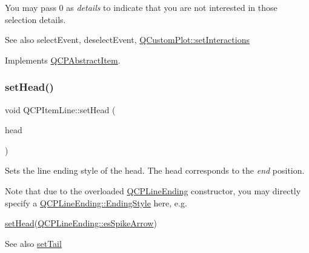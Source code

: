 You may pass 0 as {\itshape details} to indicate that you are not interested in those selection details.

\begin{DoxySeeAlso}{See also}
select\+Event, deselect\+Event, \hyperlink{class_q_custom_plot_a5ee1e2f6ae27419deca53e75907c27e5}{Q\+Custom\+Plot\+::set\+Interactions} 
\end{DoxySeeAlso}


Implements \hyperlink{class_q_c_p_abstract_item_a96d522d10ffc0413b9a366c6f7f0476b}{Q\+C\+P\+Abstract\+Item}.

\hypertarget{class_q_c_p_item_line_aebf3d687114d584e0459db6759e2c3c3}{}\label{class_q_c_p_item_line_aebf3d687114d584e0459db6759e2c3c3} 
\subsubsection{\texorpdfstring{set\+Head()}{setHead()}}
{\footnotesize\ttfamily void Q\+C\+P\+Item\+Line\+::set\+Head (\begin{DoxyParamCaption}\item[{const \hyperlink{class_q_c_p_line_ending}{Q\+C\+P\+Line\+Ending} \&}]{head }\end{DoxyParamCaption})}

Sets the line ending style of the head. The head corresponds to the {\itshape end} position.

Note that due to the overloaded \hyperlink{class_q_c_p_line_ending}{Q\+C\+P\+Line\+Ending} constructor, you may directly specify a \hyperlink{class_q_c_p_line_ending_a5ef16e6876b4b74959c7261d8d4c2cd5}{Q\+C\+P\+Line\+Ending\+::\+Ending\+Style} here, e.\+g.
\begin{DoxyCode}
\hyperlink{class_q_c_p_item_line_aebf3d687114d584e0459db6759e2c3c3}{setHead}(\hyperlink{class_q_c_p_line_ending_a5ef16e6876b4b74959c7261d8d4c2cd5ab9964d0d03f812d1e79de15edbeb2cbf}{QCPLineEnding::esSpikeArrow}) 
\end{DoxyCode}


\begin{DoxySeeAlso}{See also}
\hyperlink{class_q_c_p_item_line_ac264222c3297a7efe33df9345c811a5f}{set\+Tail} 
\end{DoxySeeAlso}
\hypertarget{class_q_c_p_item_line_a572528dab61c1abe205822fbd5db4b27}{}\label{class_q_c_p_item_line_a572528dab61c1abe205822fbd5db4b27} 
